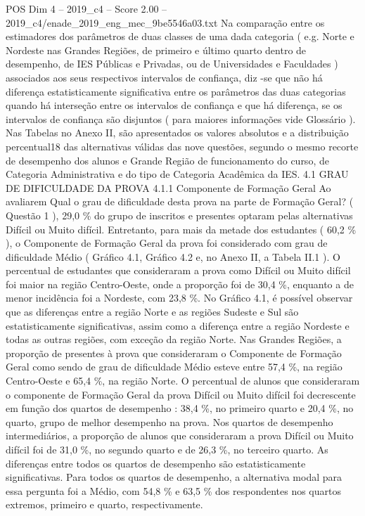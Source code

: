 \begin{textsample}{POS Dim 4 – 2019\_c4 – Score 2.00 – 2019\_c4/enade\_2019\_eng\_mec\_9be5546a03.txt}
Na comparação entre os estimadores dos parâmetros de duas classes de uma dada categoria ( e.g.
Norte e Nordeste nas Grandes Regiões, de primeiro e último quarto dentro de desempenho, de IES Públicas e Privadas, ou de Universidades e Faculdades ) associados aos seus respectivos intervalos de confiança, diz -se que não há diferença estatisticamente significativa entre os parâmetros das duas categorias quando há interseção entre os intervalos de confiança e que há diferença, se os intervalos de confiança são disjuntos ( para maiores informações vide Glossário ).
Nas Tabelas no Anexo II, são apresentados os valores absolutos e a distribuição percentual18 das alternativas válidas das nove questões, segundo o mesmo recorte de desempenho dos alunos e Grande Região de funcionamento do curso, de Categoria Administrativa e do tipo de Categoria Acadêmica da IES. 4.1 GRAU DE DIFICULDADE DA PROVA 4.1.1 Componente de Formação Geral Ao avaliarem Qual o grau de dificuldade desta prova na parte de Formação Geral? ( Questão 1 ), 29,0 \% do grupo de inscritos e presentes optaram pelas alternativas Difícil ou Muito difícil.
Entretanto, para mais da metade dos estudantes ( 60,2 \% ), o Componente de Formação Geral da prova foi considerado com grau de dificuldade Médio ( Gráfico 4.1, Gráfico 4.2 e, no Anexo II, a Tabela II.1 ).
O percentual de estudantes que consideraram a prova como Difícil ou Muito difícil foi maior na região Centro-Oeste, onde a proporção foi de 30,4 \%, enquanto a de menor incidência foi a Nordeste, com 23,8 \%.
No Gráfico 4.1, é possível observar que as diferenças entre a região Norte e as regiões Sudeste e Sul são estatisticamente significativas, assim como a diferença entre a região Nordeste e todas as outras regiões, com exceção da região Norte.
Nas Grandes Regiões, a proporção de presentes à prova que consideraram o Componente de Formação Geral como sendo de grau de dificuldade Médio esteve entre 57,4 \%, na região Centro-Oeste e 65,4 \%, na região Norte.
O percentual de alunos que consideraram o componente de Formação Geral da prova Difícil ou Muito difícil foi decrescente em função dos quartos de desempenho : 38,4 \%, no primeiro quarto e 20,4 \%, no quarto, grupo de melhor desempenho na prova.
Nos quartos de desempenho intermediários, a proporção de alunos que consideraram a prova Difícil ou Muito difícil foi de 31,0 \%, no segundo quarto e de 26,3 \%, no terceiro quarto.
As diferenças entre todos os quartos de desempenho são estatisticamente significativas.
Para todos os quartos de desempenho, a alternativa modal para essa pergunta foi a Médio, com 54,8 \% e 63,5 \% dos respondentes nos quartos extremos, primeiro e quarto, respectivamente.

\end{textsample}
